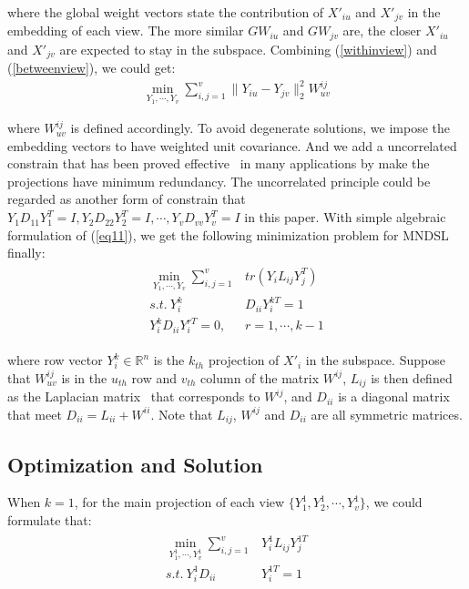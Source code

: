 \documentclass[journal]{IEEEtran}
\begin{document}
where the global weight vectors state the contribution of $X'_{iu}$ and $X'_{jv}$ in the embedding of each view. 
The more similar $GW_{iu}$ and $GW_{jv}$ are, the closer $X'_{iu}$ and $X'_{jv}$ are expected to stay in the subspace. 
Combining (\ref{withinview}) and (\ref{betweenview}), we could get: 
\begin{gather}
\min_{Y_1,\cdots, Y_v} \sum_{i,j=1}^v \|Y_{iu}-Y_{jv} \|_2^2 W_{uv}^{ij}
\label{eq11}
\end{gather}

where $W_{uv}^{ij}$ is defined accordingly. 
To avoid degenerate solutions, we impose the embedding vectors to have weighted unit covariance. 
And we add a uncorrelated constrain that has been proved effective~\cite{MUDA,MVLPP} in many applications by make the projections have minimum redundancy. 
The uncorrelated principle could be regarded as another form of constrain that $Y_1 D_{11} Y_1^T=I, Y_2 D_{22} Y_2^T=I, \cdots, Y_v D_{vv} Y_v^T=I$ in this paper. 
With simple algebraic formulation of (\ref{eq11}), we get the following minimization problem for MNDSL finally: 
\begin{align}
\begin{split}
\min_{Y_1,\cdots, Y_v} \sum_{i,j=1}^v& tr(Y_i L_{ij} Y_j^{T}) \\
s.t.\ Y_i^k& D_{ii} Y_i^{kT} = 1 \\
Y_i^k  D_{ii} Y_i^{rT} = 0, &r=1,\cdots, k-1
\label{MNDSL}
\end{split}
\end{align}

where row vector $Y_i^k\in \mathbb{R}^{n}$ is the $k_{th}$ projection of $X'_i$ in the subspace. 
Suppose that $W_{uv}^{ij}$ is in the $u_{th}$ row and $v_{th}$ column of the matrix $W^{ij}$, $L_{ij}$ is then defined as the Laplacian matrix~\cite{LE} that corresponds to $W^{ij}$, and $D_{ii}$ is a diagonal matrix that meet $D_{ii}=L_{ii} + W^{ii}$. 
Note that $L_{ij}$, $W^{ij}$ and $D_{ii}$ are all symmetric matrices. 


\subsection{Optimization and Solution}
When $k=1$, for the main projection of each view $\{Y_1^1, Y_2^1, \cdots, Y_v^1 \}$, we could formulate that: 
\begin{align}
\begin{split}
\min_{Y_1^1,\cdots,Y_v^1} \sum_{i,j=1}^v &Y_i^1 L_{ij} Y_j^{1T} \\
s.t.\ Y_i^1D_{ii}&Y_i^{1T}=1 
\label{mainprojection}
\end{split}
\end{align}
\end{document}
